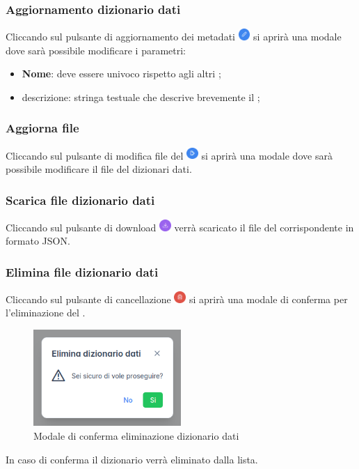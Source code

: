 \subsubsection{Aggiornamento dizionario dati}
Cliccando sul pulsante di aggiornamento dei metadati \includegraphics[height=1.2em]{assets/dd_edit_metadata_button.png} si aprirà una modale dove sarà possibile modificare i parametri:
\begin{itemize}
  \item \textbf{Nome}: deve essere univoco rispetto agli altri ;
  \item descrizione: stringa testuale che descrive brevemente il ;
\end{itemize}

\subsubsection{Aggiorna file }
Cliccando sul pulsante di modifica file del  \includegraphics[height=1.2em]{assets/dd_edit_button.png} si aprirà una modale dove sarà possibile modificare il file del dizionari dati.

\subsubsection{Scarica file dizionario dati}
Cliccando sul pulsante di download \includegraphics[height=1.2em]{assets/dd_download_button.png} verrà scaricato il file del  corrispondente in formato JSON.

\subsubsection{Elimina file dizionario dati}
Cliccando sul pulsante di cancellazione \includegraphics[height=1.2em]{assets/dd_delete_button.png} si aprirà una modale di conferma per l'eliminazione del .
\begin{figure}[H]
  \centering
  \includegraphics[width=0.5\textwidth]{assets/dd_confirm_delete.png}
  \caption{Modale di conferma eliminazione dizionario dati}
\end{figure}
In caso di conferma il dizionario verrà eliminato dalla lista.
